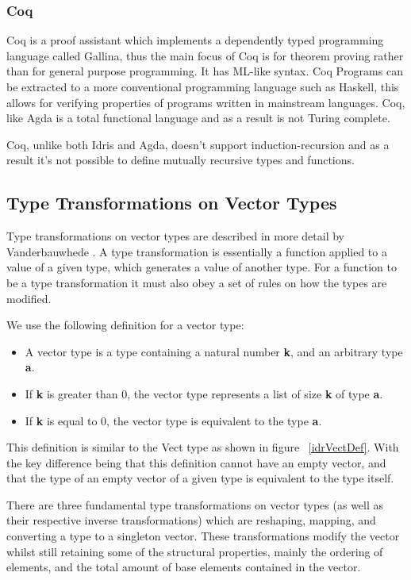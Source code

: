 \subsubsection{Coq}
Coq\cite{coq} is a proof assistant which implements a dependently typed programming language called Gallina, 
thus the main focus of Coq is for theorem proving rather than for general purpose programming. It has ML-like syntax. 
Coq Programs can be extracted to a more conventional programming language such as Haskell, this allows for verifying properties of programs
written in mainstream languages.
Coq, like Agda is a total functional language and as a result is not Turing complete. 

Coq, unlike both Idris and Agda, doesn't support induction-recursion\cite{inductionrecur} and as a result it's not
possible to define mutually recursive types and functions.




\subsection{Type Transformations on Vector Types}
Type transformations on vector types are described in more detail by Vanderbauwhede \cite{transformations}.
A type transformation is essentially a function applied to a value of a given type, which generates a value of 
another type. For a function to be a type transformation it must also obey a set of rules on how
the types are modified. 

We use the following definition for a vector type:

\begin{itemize}
\item A vector type is a type containing a natural number \textbf{k}, and an arbitrary type \textbf{a}.  
\item If \textbf{k} is greater than 0, the vector type represents a list of size \textbf{k} of type \textbf{a}.
\item If \textbf{k} is equal to 0, the vector type is equivalent to the type \textbf{a}.
\end{itemize}

This definition is similar to the Vect type as shown in figure ~\ref{idrVectDef}. With the key difference being
that this definition cannot have an empty vector, and that the type of an empty vector of a given
type is equivalent to the type itself.

There are three fundamental type transformations on vector types (as well
as their respective inverse transformations) which are reshaping, mapping, and converting a type to a singleton vector. 
These transformations modify the vector whilst still retaining some of the structural properties, mainly the ordering of elements,
and the total amount of base elements contained in the vector.

